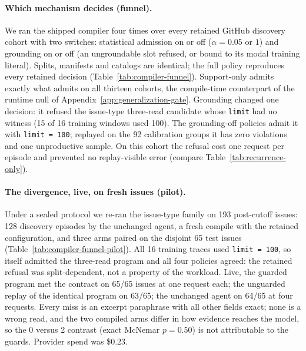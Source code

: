\paragraph{Which mechanism decides (funnel).}
We ran the shipped compiler four times over every retained GitHub discovery cohort with two
switches: statistical admission on or off ($\alpha = 0.05$ or $1$) and grounding on or off (an
ungroundable slot refused, or bound to its modal training literal). Splits, manifests and
catalogs are identical; the full policy reproduces every retained decision
(Table~\ref{tab:compiler-funnel}). Support-only admits exactly what \method{} admits on all
thirteen cohorts, the compile-time counterpart of the runtime null of
Appendix~\ref{app:generalization-gate}. Grounding changed one decision: it refused the issue-type
three-read candidate whose \texttt{limit} had no witness (15 of 16 training windows used 100).
The grounding-off policies admit it with \texttt{limit = 100}; replayed on the 92 calibration
groups it has zero violations and one unproductive sample. On this cohort the refusal cost one
request per episode and prevented no replay-visible error (compare Table~\ref{tab:recurrence-only}).

\begin{table}[t]
  \centering\small
  \caption{Same-IR compiler funnel: the program each policy admits per cohort.}
  \label{tab:compiler-funnel}
  \resizebox{\linewidth}{!}{}
\end{table}

\paragraph{The divergence, live, on fresh issues (pilot).}
Under a sealed protocol we re-ran the issue-type family on 193 post-cutoff issues: 128 discovery
episodes by the unchanged agent, a fresh compile with the retained configuration, and three arms
paired on the disjoint 65 test issues (Table~\ref{tab:compiler-funnel-pilot}). All 16 training
traces used \texttt{limit = 100}, so \method{} itself admitted the three-read program and all
four policies agreed: the retained refusal was split-dependent, not a property of the workload.
Live, the guarded program met the contract on 65/65 issues at one request each; the unguarded
replay of the identical program on 63/65; the unchanged agent on 64/65 at four requests. Every
miss is an excerpt paraphrase with all other fields exact; none is a wrong read, and the two
compiled arms differ in how evidence reaches the model, so the 0 versus 2 contrast (exact
McNemar $p = 0.50$) is not attributable to the guards. Provider spend was \$0.23.

